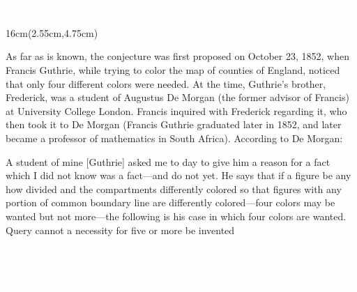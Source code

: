 \documentclass[11pt,a4paper,twoside]{book}
\newenvironment{positionedparagraph}[4]{%
	\begin{textblock*}{#1}(#2,#3)
		\noindent\textbf{#4}\par\medskip
	}{%
	\end{textblock*}
}
\begin{document}
\begin{center}
\vspace{0.5cm}
\begin{tcolorbox}[colback=blue!48, colframe=blue!48, width=16cm, top=-0.3cm, bottom=-0.2cm, boxrule=0pt, arc=0pt, outer arc=0pt, sharp corners]\textcolor{white}{\textbf{\\ \\  Early proof attempts \\}}
\end{tcolorbox}
\end{center}
\begin{positionedparagraph}{16cm}{2.55cm}{4.75cm}
	\\ As far as is known, the conjecture was first proposed on October 23, 1852, when Francis Guthrie, while trying to color the map of counties of England, noticed that only four different colors were needed. At the time, Guthrie's brother, Frederick, was a student of Augustus De Morgan (the former advisor of Francis) at University College London. Francis inquired with Frederick regarding it, who then took it to De Morgan (Francis Guthrie graduated later in 1852, and later became a professor of mathematics in South Africa). According to De Morgan:
	
	A student of mine [Guthrie] asked me to day to give him a reason for a fact which I did not know was a fact—and do not yet. He says that if a figure be any how divided and the compartments differently colored so that figures with any portion of common boundary line are differently colored—four colors may be wanted but not more—the following is his case in which four colors are wanted. Query cannot a necessity for five or more be invented
	
\end{positionedparagraph}
\begin{center}
	\vspace{5cm}
	\begin{tcolorbox}[colback=blue!48, colframe=blue!48, width=16cm, top=-0.3cm, bottom=-0.2cm, boxrule=0pt, arc=0pt, outer arc=0pt, sharp corners]\textcolor{white}{\textbf{\\ \\  Proof by computer \\}}
	\end{tcolorbox}
\end{center}
\end{document}
